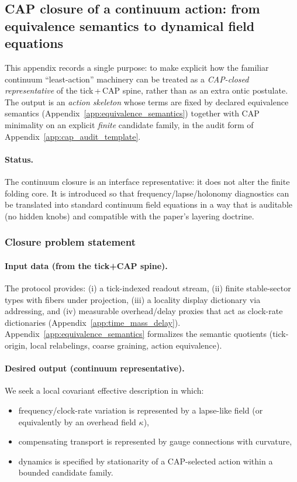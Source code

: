 \subsection{CAP closure of a continuum action: from equivalence semantics to dynamical field equations}
\label{app:cap_continuum_action_closure}

This appendix records a single purpose: to make explicit how the familiar continuum ``least-action'' machinery can be treated as a \emph{CAP-closed representative} of the tick\,+\,CAP spine, rather than as an extra ontic postulate.
The output is an \emph{action skeleton} whose terms are fixed by declared equivalence semantics (Appendix~\ref{app:equivalence_semantics}) together with CAP minimality on an explicit \emph{finite} candidate family, in the audit form of Appendix~\ref{app:cap_audit_template}.

\paragraph{Status.}
\InterfaceTag The continuum closure is an interface representative: it does not alter the finite folding core.
It is introduced so that frequency/lapse/holonomy diagnostics can be translated into standard continuum field equations in a way that is auditable (no hidden knobs) and compatible with the paper's layering doctrine.

\subsubsection{Closure problem statement}
\label{subsec:cap_continuum_closure_problem}

\paragraph{Input data (from the tick+CAP spine).}
\InterfaceTag The protocol provides: (i) a tick-indexed readout stream, (ii) finite stable-sector types with fibers under projection, (iii) a locality display dictionary via addressing, and (iv) measurable overhead/delay proxies that act as clock-rate dictionaries (Appendix~\ref{app:time_mass_delay}).
Appendix~\ref{app:equivalence_semantics} formalizes the semantic quotients (tick-origin, local relabelings, coarse graining, action equivalence).

\paragraph{Desired output (continuum representative).}
\InterfaceTag We seek a local covariant effective description in which:
\begin{itemize}
\item frequency/clock-rate variation is represented by a lapse-like field (or equivalently by an overhead field $\kappa$),
\item compensating transport is represented by gauge connections with curvature,
\item dynamics is specified by stationarity of a CAP-selected action within a bounded candidate family.
\end{itemize}

